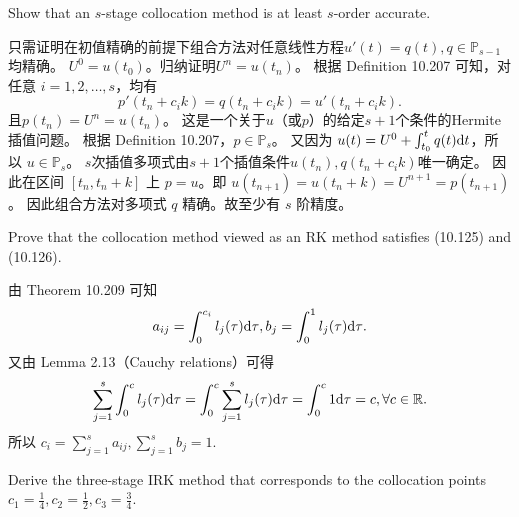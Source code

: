 \documentclass[lang=cn,a4paper,newtx,bibend=bibtex]{elegantpaper}
\begin{document}
\begin{prob}[Exercise 10.210]
  Show that an $s$-stage collocation method is at least $s$-order accurate.
\end{prob}

\begin{solution}
  只需证明在初值精确的前提下组合方法对任意线性方程$u'(t) = q(t), q\in \mathbb{P}_{s-1}$均精确。
  $U^0 = u(t_0)$。归纳证明$U^n = u(t_n)$。
  根据 Definition 10.207 可知，对任意 $i=1,2,\dots,s$，均有
  \begin{equation*}
    p'(t_n+c_ik) = q(t_n+c_ik) = u'(t_n+c_ik).
  \end{equation*}
  且$p(t_n) = U^n = u(t_n)$。
  这是一个关于$u$（或$p$）的给定$s+1$个条件的Hermite插值问题。
  根据 Definition 10.207，$p\in \mathbb{P}_s$。
  又因为 $u(t) = U^0 + \int_{t_0}^{t}{q(t)}{\mathrm{d} {t}}$，所以 $u\in \mathbb{P}_s$。
  $s$次插值多项式由$s+1$个插值条件$u(t_n), q(t_n+c_ik)$唯一确定。
  因此在区间 $[t_n, t_n+k]$ 上 $p=u$。即 $u(t_{n+1}) = u(t_n+k) = U^{n+1} = p(t_{n+1})$。
  因此组合方法对多项式 $q$ 精确。故至少有 $s$ 阶精度。
\end{solution}

\begin{prob}[Exercise 10.211]
  Prove that the collocation method viewed as an RK method satisfies (10.125) and (10.126).
\end{prob}

\begin{solution}
  由 Theorem 10.209 可知
  \begin{equation*}
    a_{ij} = \int_{0}^{c_i}{l_j(\tau)}{\mathrm{d} {\tau}}, b_j = \int_{0}^{1}{l_j(\tau)}{\mathrm{d} {\tau}}.
  \end{equation*}
  又由 Lemma 2.13（Cauchy relations）可得
  \begin{equation*}
    \sum_{j=1}^s \int_{0}^{c}{l_j(\tau)}{\mathrm{d} {\tau}} = \int_{0}^{c}{\sum_{j=1}^sl_j(\tau)}{\mathrm{d} {\tau}} = \int_{0}^{c}{1}{\mathrm{d} {\tau}} = c, \forall c\in \mathbb{R}.
  \end{equation*}
  所以 $c_i = \sum_{j=1}^s a_{ij}, \sum_{j=1}^s b_j = 1$.
\end{solution}
\newpage

\begin{prob}[Exercise 10.213]
  Derive the three-stage IRK method that corresponds to the
  collocation points $c_1=\frac 14, c_2=\frac 12, c_3=\frac 34$.
\end{prob}
\end{document}
